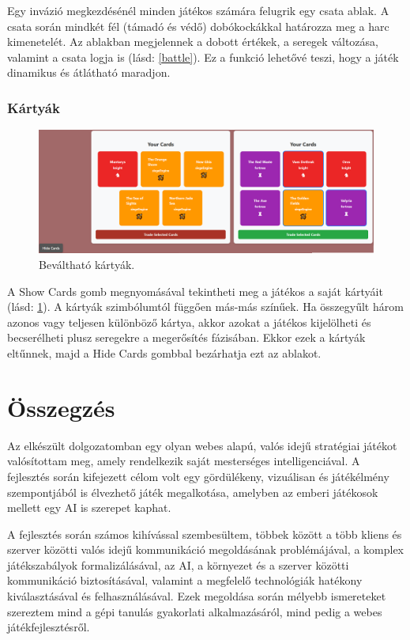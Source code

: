 \documentclass[
]{thesis-ekf}
\theoremstyle{definition}
\theoremstyle{remark}
\begin{document}
	Egy invázió megkezdésénél minden játékos számára felugrik egy csata ablak. A csata során mindkét fél (támadó és védő) dobókockákkal határozza meg a harc kimenetelét. Az ablakban megjelennek a dobott értékek, a seregek változása, valamint a csata logja is (lásd: \ref{battle}). Ez a funkció lehetővé teszi, hogy a játék dinamikus és átlátható maradjon.
	
	\subsection*{Kártyák}
	
	\begin{figure}[ht!]
		\centering
		\includegraphics[width=16cm]{kartyak.png}
		\caption{Beváltható kártyák.}
		\label{kartyak}
	\end{figure}
	
	A Show Cards gomb megnyomásával tekintheti meg a játékos a saját kártyáit (lásd: \ref{kartyak}). A kártyák szimbólumtól függően más-más színűek. Ha összegyűlt három azonos vagy teljesen különböző kártya, akkor azokat a játékos kijelölheti és becserélheti plusz seregekre a megerősítés fázisában. Ekkor ezek a kártyák eltűnnek, majd a Hide Cards gombbal bezárhatja ezt az ablakot.
	
	\chapter*{Összegzés}
	
	Az elkészült dolgozatomban egy olyan webes alapú, valós idejű stratégiai játékot valósítottam meg, amely rendelkezik saját mesterséges intelligenciával. A fejlesztés során kifejezett célom volt egy gördülékeny, vizuálisan és játékélmény szempontjából is élvezhető játék megalkotása, amelyben az emberi játékosok mellett egy AI is szerepet kaphat. 
	
	A fejlesztés során számos kihívással szembesültem, többek között a több kliens és szerver közötti valós idejű kommunikáció megoldásának problémájával, a komplex játékszabályok formalizálásával, az AI, a környezet és a szerver közötti kommunikáció biztosításával, valamint a megfelelő technológiák hatékony kiválasztásával és felhasználásával. Ezek megoldása során mélyebb ismereteket szereztem mind a gépi tanulás gyakorlati alkalmazásáról, mind pedig a webes játékfejlesztésről.
	
\end{document}
